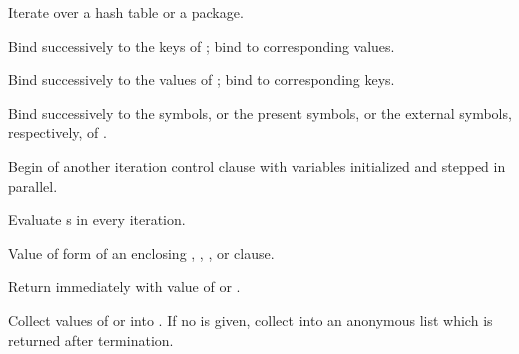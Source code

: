 \begin{LIST}{1cm}
\begin{LIST}{.5cm}
\begin{LIST}{.5cm}
      {
      Iterate over a hash table or a package.
      }

      \begin{LIST}{.5cm}

        {
        Bind  successively to the keys of ; bind  to corresponding values.
        }

        {
        Bind  successively to the values of ; bind  to corresponding keys.
        }

        {
        Bind  successively to the symbols, or the present
        symbols, or the external symbols, respectively, of
        . 
        }

      \end{LIST}
    \end{LIST}
    
    {
    Begin of another iteration control clause with variables
    initialized and stepped in parallel. 
    }

    {
    Evaluate s in every iteration.
    }

    {
      Value of  form of an enclosing ,
      , , or  clause.
    }

    {
    Return immediately with value of  or .
    }

    {
    Collect values of  or  into . If no
     is given, collect into an anonymous list which is
    returned after termination. 
    }


\end{LIST}
\end{LIST}
